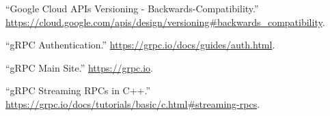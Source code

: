 \documentclass[11pt]{article}
\begin{document}
{{\begin{thebibliography}{36}
\mdbibitemlabel{{}[7]}\textquotedblleft{}Google Cloud APIs Versioning - Backwards-Compatibility.\textquotedblright{} \href{https://cloud.google.com/apis/design/versioning\%23backwards_compatibility}{{\ttfamily https://\hspace{0pt}cloud.\hspace{0pt}google.\hspace{0pt}com/\hspace{0pt}apis/\hspace{0pt}design/\hspace{0pt}versioning\#\hspace{0pt}backwards\_\hspace{0pt}compatibility}}.\label{apiversioningbackwardscompatibility}%

\mdbibitemlabel{{}[8]}\textquotedblleft{}gRPC Authentication.\textquotedblright{} \href{https://grpc.io/docs/guides/auth.html}{{\ttfamily https://\hspace{0pt}grpc.\hspace{0pt}io/\hspace{0pt}docs/\hspace{0pt}guides/\hspace{0pt}auth.\hspace{0pt}html}}.\label{grpcauth}%

\mdbibitemlabel{{}[9]}\textquotedblleft{}gRPC Main Site.\textquotedblright{} \href{https://grpc.io}{{\ttfamily https://\hspace{0pt}grpc.\hspace{0pt}io}}.\label{grpc}%

\mdbibitemlabel{{}[10]}\textquotedblleft{}gRPC Streaming RPCs in C++.\textquotedblright{} \href{https://grpc.io/docs/tutorials/basic/c.html\%23streaming-rpcs}{{\ttfamily https://\hspace{0pt}grpc.\hspace{0pt}io/\hspace{0pt}docs/\hspace{0pt}tutorials/\hspace{0pt}basic/\hspace{0pt}c.\hspace{0pt}html\#\hspace{0pt}streaming-\hspace{0pt}rpcs}}.\label{grpcstreamc}%


\end{thebibliography}}}
\end{document}
